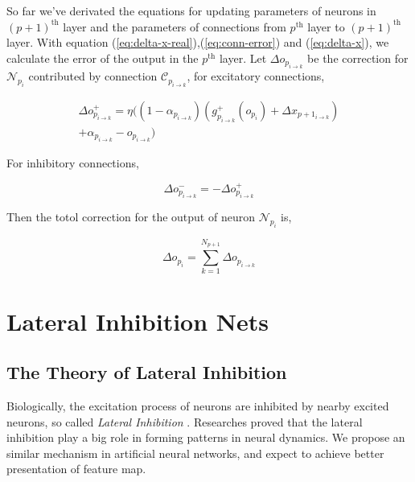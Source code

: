 \documentclass[conference]{IEEEtran}
\begin{document}
So far we've derivated the equations for updating parameters of neurons
in $(p+1)^{\text{th}}$ layer and the parameters of connections from $p^{\text{th}}$ layer to
$(p+1)^{\text{th}}$ layer. With equation (\ref{eq:delta-x-real}),(\ref{eq:conn-error})
and (\ref{eq:delta-x}), we calculate the error of the output in the $p^{\text{th}}$ layer.
Let $\Delta o_{p_{i\rightarrow{k}}}$ be the correction for $\mathcal{N}_{p_i}$
contributed by connection $\mathcal{C}_{p_{i\rightarrow{k}}}$,
for excitatory connections,

\begin{multline}
    \Delta o^{+}_{p_{i\rightarrow{k}}} =
        \eta((1-\alpha_{p_{i\rightarrow{k}}})
        (g^{+}_{p_{i\rightarrow{k}}}(o_{p_i})+\Delta x_{p+1_{i\rightarrow{k}}})\\
        +\alpha_{p_{i\rightarrow{k}}}-o_{p_{i\rightarrow{k}}})
    \label{eq:backprop-conn-pos}
\end{multline}

For inhibitory connections,

\begin{equation}
    \Delta o^{-}_{p_{i\rightarrow{k}}} = -\Delta o^{+}_{p_{i\rightarrow{k}}}
    \label{eq:backprop-conn-neg}
\end{equation}

Then the totol correction for the output of neuron $\mathcal{N}_{p_i}$ is,

\begin{equation}
    \Delta o_{p_i} = \sum_{k=1}^{N_{p+1}}\Delta o_{p_{i\rightarrow{k}}}
    \label{eq:backprop-neuron}
\end{equation}



\section{Lateral Inhibition Nets}
\subsection{The Theory of Lateral Inhibition}
Biologically, the excitation process of neurons are inhibited by nearby excited
neurons, so called \emph{Lateral Inhibition}
\cite{amari1977dynamics,blakemore1972lateral,blakemore1970lateral}.
Researches proved that the lateral inhibition play a big role in forming patterns
in neural dynamics\cite{amari1977dynamics}.
We propose an similar mechanism in artificial neural networks, and expect to
achieve better presentation of feature map.
\end{document}
